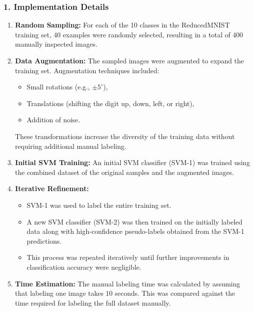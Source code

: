 \documentclass[12pt]{article}
\begin{document}
\subsubsection*{1. Implementation Details}
\begin{enumerate}
    \item \textbf{Random Sampling:} For each of the 10 classes in the ReducedMNIST training set, 40 examples were randomly selected, resulting in a total of 400 manually inspected images.
    
    \item \textbf{Data Augmentation:} The sampled images were augmented to expand the training set. Augmentation techniques included:
    \begin{itemize}
        \item Small rotations (e.g., $\pm 5^\circ$),
        \item Translations (shifting the digit up, down, left, or right),
        \item Addition of noise.
    \end{itemize}
    These transformations increase the diversity of the training data without requiring additional manual labeling.
    
    \item \textbf{Initial SVM Training:} An initial SVM classifier (SVM-1) was trained using the combined dataset of the original samples and the augmented images.
    
    \item \textbf{Iterative Refinement:} 
    \begin{itemize}
        \item SVM-1 was used to label the entire training set.
        \item A new SVM classifier (SVM-2) was then trained on the initially labeled data along with high-confidence pseudo-labels obtained from the SVM-1 predictions.
        \item This process was repeated iteratively until further improvements in classification accuracy were negligible.
    \end{itemize}
    
    \item \textbf{Time Estimation:} The manual labeling time was calculated by assuming that labeling one image takes 10 seconds. This was compared against the time required for labeling the full dataset manually.
\end{enumerate}
\end{document}
